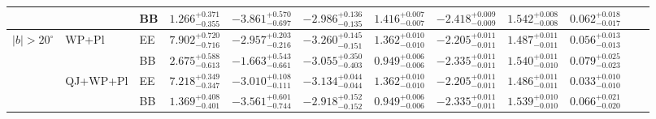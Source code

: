\begin{table}[h]
\begin{adjustbox}{center}
{\begin{tabular}{llllcccccccc}
 &          & BB & $1.266^{+0.371}_{-0.355}$ & $-3.861^{+0.570}_{-0.697}$ & $-2.986^{+0.136}_{-0.135}$ & $1.416^{+0.007}_{-0.007}$ & $-2.418^{+0.009}_{-0.009}$ & $1.542^{+0.008}_{-0.008}$ & $0.062^{+0.018}_{-0.017}$ \\
\midrule
\multirow{4}{*}{$|b|>20^\circ$}
 & WP+Pl    & EE & $7.902^{+0.720}_{-0.716}$ & $-2.957^{+0.203}_{-0.216}$ & $-3.260^{+0.145}_{-0.151}$ & $1.362^{+0.010}_{-0.010}$ & $-2.205^{+0.011}_{-0.011}$ & $1.487^{+0.011}_{-0.011}$ & $0.056^{+0.013}_{-0.013}$ \\
 &          & BB & $2.675^{+0.588}_{-0.613}$ & $-1.663^{+0.543}_{-0.661}$ & $-3.055^{+0.350}_{-0.403}$ & $0.949^{+0.006}_{-0.006}$ & $-2.335^{+0.011}_{-0.011}$ & $1.540^{+0.011}_{-0.010}$ & $0.079^{+0.025}_{-0.023}$ \\
 & QJ+WP+Pl & EE & $7.218^{+0.349}_{-0.347}$ & $-3.010^{+0.108}_{-0.111}$ & $-3.134^{+0.044}_{-0.044}$ & $1.362^{+0.010}_{-0.010}$ & $-2.205^{+0.011}_{-0.011}$ & $1.486^{+0.011}_{-0.011}$ & $0.033^{+0.010}_{-0.010}$ \\
 &          & BB & $1.369^{+0.408}_{-0.401}$ & $-3.561^{+0.601}_{-0.744}$ & $-2.918^{+0.152}_{-0.152}$ & $0.949^{+0.006}_{-0.006}$ & $-2.335^{+0.011}_{-0.011}$ & $1.539^{+0.010}_{-0.010}$ & $0.066^{+0.021}_{-0.020}$ \\
\bottomrule
\end{tabular}}
\end{adjustbox}
\end{table}